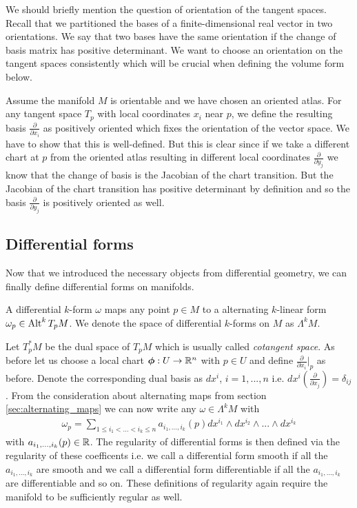 \documentclass[../master_thesis.tex]{subfiles}
\begin{document}
We should briefly mention the question of orientation of the tangent spaces.
Recall that we partitioned the bases of a finite-dimensional real vector 
in two orientations. We say that two bases have the same 
orientation if the change of basis matrix has positive determinant.
We want to choose an orientation on the tangent spaces consistently which 
will be crucial when defining the volume form below.

Assume the manifold $M$ is orientable and we have chosen an oriented atlas.
For any tangent space $T_p$ with local coordinates $x_i$ near $p$, 
we define the resulting basis $\frac{\partial}{\partial x_i}$ as positively
oriented which fixes the orientation of the vector space. We have to show 
that this is well-defined. But this is clear since if we take a different 
chart at $p$ from the oriented atlas resulting in different local coordinates 
$\frac{\partial}{\partial y_j}$
we know that the change of 
basis is the Jacobian of the chart transition. But the Jacobian of the 
chart transition has positive determinant by definition and so the basis 
$\frac{\partial}{\partial y_j}$ is positively oriented as well.

\subsection{Differential forms}\label{sec:differential_forms_subsection}
Now that we introduced the necessary objects from differential geometry, 
we can finally define differential forms on manifolds.

\begin{definition}
    A differential $k$-form $\omega$ maps any point $p \in M$ to a 
    alternating $k$-linear form $\omega_p \in {\text{Alt}^{k}\,T_p M}$.
    We denote the space of differential $k$-forms on $M$ as $\Lambda^k M$.
\end{definition}

Let $T_p^* M$ be the dual space of $T_p M$ which is usually called 
\textit{cotangent space}.
As before let us choose a local chart $\boldsymbol{\phi}: U \rightarrow \mathbb{R}^n$ with 
$p \in U$ and define $\frac{\partial}{\partial x_i}|_p$ as before. 
Denote the corresponding
dual basis as $dx^i$, $i = 1,...,n$ i.e. 
$dx^i(\frac{\partial}{\partial x_j}) = \delta_{ij}$. 
From the consideration about
alternating maps from section \ref{sec:alternating_maps} we can now write any 
$\omega \in \Lambda^k M$ with 
\begin{align*}
    \omega_p = \sum\limits_{1\leq i_1 < ... < i_k \leq n} 
        a_{i_1,...,i_k}(p) dx^{i_1} \wedge dx^{i_2} \wedge ... \wedge dx^{i_k}
\end{align*}
with $a_{i_1,...,i_k}(p) \in \mathbb{R}$. The regularity of differential forms 
is then defined via the regularity of these coefficents i.e. we call 
a differential form smooth if all the $a_{i_1,...,i_k}$ are smooth 
and we call a differential form differentiable if all the $a_{i_1,...,i_k}$
are differentiable and so on. These definitions of regularity again require 
the manifold to be sufficiently regular as well.
\end{document}

